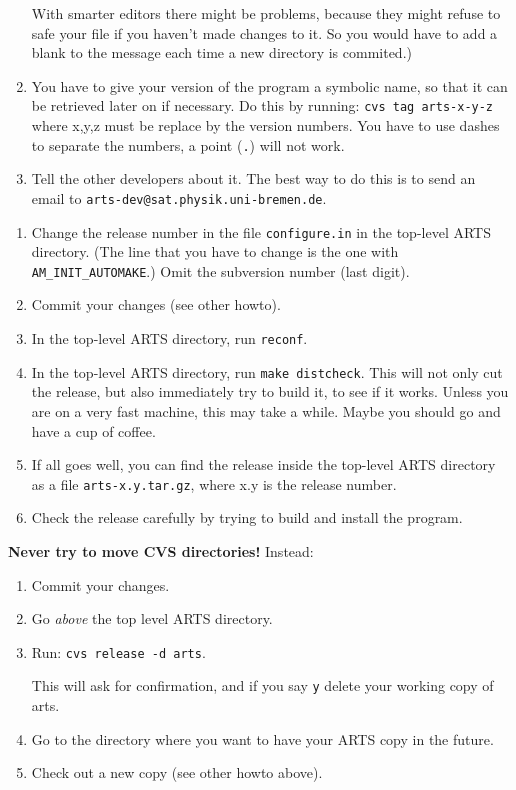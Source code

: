 \begin{enumerate}
  With smarter editors there might be problems, because they might
  refuse to safe your file if you haven't made changes to it. So you
  would have to add a blank to the message each time a new directory
  is commited.)
\item You have to give your version of the program a symbolic name, so
  that it can be retrieved later on if necessary. Do this by running:
  \verb|cvs tag arts-x-y-z| where x,y,z must be replace by the version
  numbers. You have to use dashes to separate the numbers, a point
  (\verb|.|) will not work.
\item Tell the other developers about it. The best way to do this is
  to send an email to \verb|arts-dev@sat.physik.uni-bremen.de|.
\end{enumerate}


\label{sec:release}
\begin{enumerate}
\item Change the release number in the file \verb|configure.in| in the
  top-level ARTS directory. (The line that you have to change is the
  one with \verb|AM_INIT_AUTOMAKE|.) Omit the subversion number (last digit).
\item Commit your changes (see other howto). 
\item In the top-level ARTS directory, run \verb|reconf|.
\item In the top-level ARTS directory, run \verb|make distcheck|. This
  will not only cut the release, but also immediately try to build
  it, to see if it works. Unless you are on a very fast machine, this
  may take a while. Maybe you should go and have a cup of coffee.
\item If all goes well, you can find the release inside the top-level
  ARTS directory as a file \verb|arts-x.y.tar.gz|, where x.y is the
  release number.
\item Check the release carefully by trying to build and install the
  program. 
\end{enumerate}


\textbf{Never try to move CVS directories!} Instead:
\begin{enumerate}
\item Commit your changes.
\item Go \emph{above} the top level ARTS directory.
\item Run: \verb|cvs release -d arts|.
  
  This will ask for confirmation, and if you say \verb|y| delete your
  working copy of arts.
\item Go to the directory where you want to have your ARTS copy in the
  future.
\item Check out a new copy (see other howto above).
\end{enumerate}


